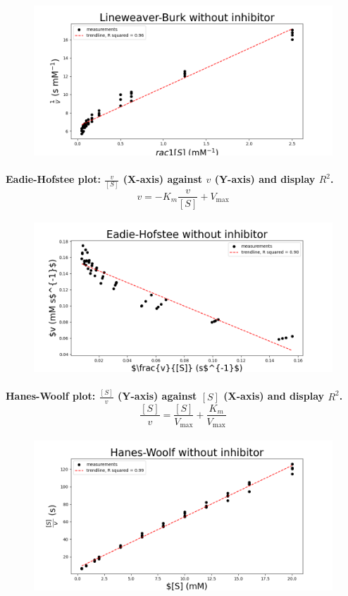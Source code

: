 \documentclass[a4paper,12pt]{article}
\begin{document}
\begin{figure}[h]
    \includegraphics[scale=0.4]{fig2_2.png}
    \centering
\end{figure}

\paragraph{Eadie-Hofstee plot: $\frac{v}{[S]}$ (X-axis) against $v$ (Y-axis) and display $R^2$. \[v=-K_m\frac{v}{[S]}+V_{\text{max}}\]}

\begin{figure}[h]
    \includegraphics[scale=0.4]{fig2_3.png}
    \centering
\end{figure}

\paragraph{Hanes-Woolf plot: $\frac{[S]}{v}$ (Y-axis) against $[S]$ (X-axis) and display $R^2$. \[\frac{[S]}{v}=\frac{[S]}{V_{\text{max}}}+\frac{K_m}{V_{\text{max}}}\]}

\begin{figure}[h]
    \includegraphics[scale=0.4]{fig2_4.png}
    \centering
\end{figure}
\end{document}
